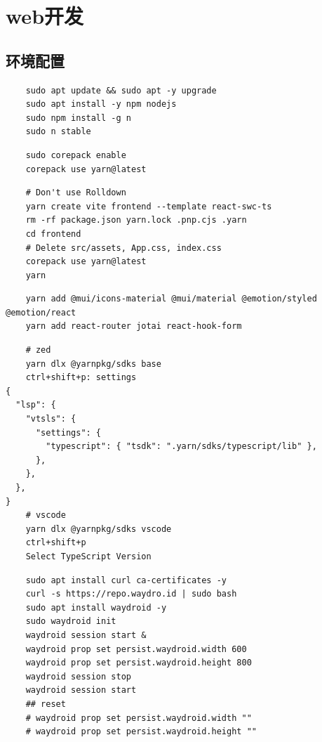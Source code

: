 \section{web开发}
\subsection{环境配置}
\begin{code}[title=node]
	\begin{verbatim}
	sudo apt update && sudo apt -y upgrade
	sudo apt install -y npm nodejs
	sudo npm install -g n
	sudo n stable
\end{verbatim}
\end{code}

\begin{code}[title=yarn]
	\begin{verbatim}
	sudo corepack enable
	corepack use yarn@latest
\end{verbatim}
\end{code}

\begin{code}[title=vite]
	\begin{verbatim}
	# Don't use Rolldown
	yarn create vite frontend --template react-swc-ts
	rm -rf package.json yarn.lock .pnp.cjs .yarn
	cd frontend
	# Delete src/assets, App.css, index.css
	corepack use yarn@latest
	yarn
\end{verbatim}
\end{code}

\begin{code}[title=react]
	\begin{verbatim}
	yarn add @mui/icons-material @mui/material @emotion/styled @emotion/react
	yarn add react-router jotai react-hook-form
\end{verbatim}
\end{code}

\begin{code}[title=IDE]
	\begin{verbatim}
	# zed
	yarn dlx @yarnpkg/sdks base
	ctrl+shift+p: settings
{
  "lsp": {
    "vtsls": {
      "settings": {
        "typescript": { "tsdk": ".yarn/sdks/typescript/lib" },
      },
    },
  },
}
    # vscode
    yarn dlx @yarnpkg/sdks vscode
    ctrl+shift+p
    Select TypeScript Version
\end{verbatim}
\end{code}

\begin{code}[title=Android]
	\begin{verbatim}
    sudo apt install curl ca-certificates -y
    curl -s https://repo.waydro.id | sudo bash
    sudo apt install waydroid -y
    sudo waydroid init
    waydroid session start &
    waydroid prop set persist.waydroid.width 600
    waydroid prop set persist.waydroid.height 800
    waydroid session stop
    waydroid session start
    ## reset
    # waydroid prop set persist.waydroid.width ""
    # waydroid prop set persist.waydroid.height ""
\end{verbatim}
\end{code}

